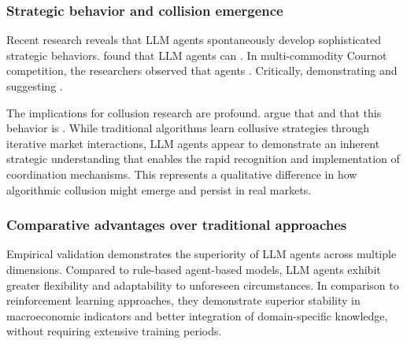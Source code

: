\subsubsection*{Strategic behavior and collision emergence}

Recent research reveals that LLM agents spontaneously develop sophisticated strategic behaviors. \textcite[p.1]{lin_strategic_2025} found that LLM agents can . In multi-commodity Cournot competition, the researchers observed that agents  \parencite[p.2]{lin_strategic_2025}. Critically,  \parencite[p.6]{lin_strategic_2025} demonstrating  and suggesting  \parencite[p.6]{lin_strategic_2025}.

The implications for collusion research are profound. \textcite[p.8]{lin_strategic_2025} argue that  and that this behavior is . While traditional algorithms learn collusive strategies through iterative market interactions, LLM agents appear to demonstrate an inherent strategic understanding that enables the rapid recognition and implementation of coordination mechanisms. This represents a qualitative difference in how algorithmic collusion might emerge and persist in real markets.

\subsubsection*{Comparative advantages over traditional approaches}

Empirical validation demonstrates the superiority of LLM agents across multiple dimensions. Compared to rule-based agent-based models, LLM agents exhibit greater flexibility and adaptability to unforeseen circumstances. In comparison to reinforcement learning approaches, they demonstrate superior stability in macroeconomic indicators and better integration of domain-specific knowledge, without requiring extensive training periods.

